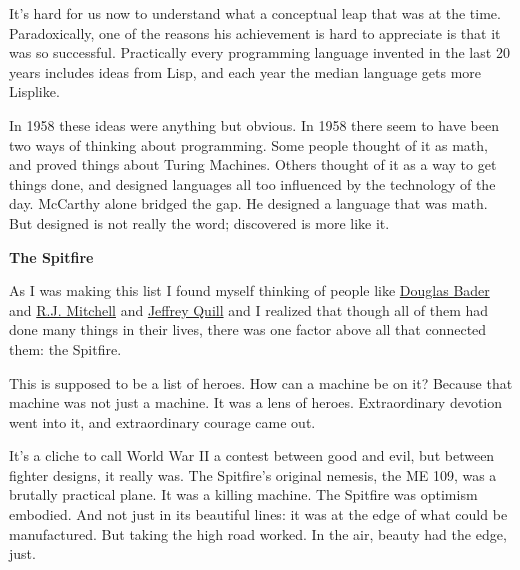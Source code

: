 It's hard for
                  us now to understand what a conceptual leap that was at the
                  time. Paradoxically, one of the reasons his achievement is
                  hard to appreciate is that it was so successful. Practically
                  every programming language invented in the last 20 years
                  includes ideas from Lisp, and each year the median language
                  gets more Lisplike.

In 1958 these ideas were
                  anything but obvious. In 1958 there seem to have been two ways
                  of thinking about programming. Some people thought of it as
                  math, and proved things about Turing Machines. Others thought
                  of it as a way to get things done, and designed languages all
                  too influenced by the technology of the day. McCarthy alone
                  bridged the gap. He designed a language that was math. But
                  designed is not really the word; discovered is more like
                  it.


                  \textbf{The Spitfire}

As I was making this list I
                  found myself thinking of people like
                  \href{http://en.wikipedia.org/wiki/Douglas\_Bader}{Douglas Bader}
                  and
                  \href{http://en.wikipedia.org/wiki/R.\_J.\_Mitchell}{R.J. Mitchell}
                  and
                  \href{http://www.amazon.com/Spitfire-Pilots-Story-Crecy-Cover/dp/0947554726}{Jeffrey Quill}
                  and I realized that though all of them had done many things in
                  their lives, there was one factor above all that connected
                  them: the Spitfire.

This is supposed to be a list
                  of heroes. How can a machine be on it? Because that machine
                  was not just a machine. It was a lens of heroes. Extraordinary
                  devotion went into it, and extraordinary courage came out.

It's
                  a cliche to call World War II a contest between good and evil,
                  but between fighter designs, it really was. The Spitfire's
                  original nemesis, the ME 109, was a brutally practical plane.
                  It was a killing machine. The Spitfire was optimism embodied.
                  And not just in its beautiful lines: it was at the edge of
                  what could be manufactured. But taking the high road worked.
                  In the air, beauty had the edge, just.


